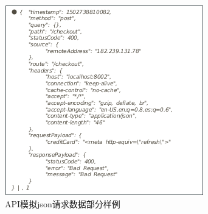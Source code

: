 \begin{figure}[!h]
    \setlength{\abovecaptionskip}{0.cm}
    \setlength{\belowcaptionskip}{-0.cm}
    \centering
     \includegraphics[scale=0.4]{Figs/json.png}
    \caption{API模拟json请求数据部分样例}
    \label{fig:json_sample}
\end{figure}